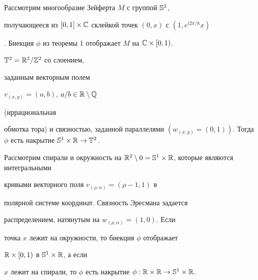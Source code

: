 \begin{exam}


Рассмотрим многообразие Зейферта $M$ с группой $\Bbb{S}^1$,


получающееся из $[0, 1] \times \Bbb{C}$ склейкой точек $(0, x)$ с $(1,


e^{i 2 \pi/k} x)$


\cite{Ar}. Биекция $\phi$ из теоремы 1 отображает $M$ на $\Bbb{C}


\times [0,1)$.


\end{exam}





\begin{exam}


$\Bbb{T}^2=\Bbb{R}^2/\Bbb{Z}^2$ со слоением,


заданным векторным полем


$v_{(x,y)}=(a, b)$, $a/b \in \Bbb{R} \setminus \Bbb{Q}$


(иррациональная


обмотка тора) и связностью, заданной параллелями $(w_{(x,y)}=(0,


1))$. Тогда $\phi$ есть накрытие $\Bbb{S}^1 \times \Bbb{R} \to


\Bbb{T}^2$.


\end{exam}





\begin{exam}


Рассмотрим спирали и окружность на $\Bbb{R}^2 \setminus


{0} = \Bbb{S}^1 \times \Bbb{R}$, которые являются интегральными


кривыми векторного поля $v_{(\rho, \alpha)}= (\rho -1,1)$ в


полярной системе координат. Связность Эресмана задается


распределением, натянутым на $w_{(\rho, \alpha)}=(1,0)$. Если


точка $x$ лежит на окружности, то биекция $\phi$ отображает


$\Bbb{R} \times [0, 1)$ в $\Bbb{S}^1 \times \Bbb{R}$, а если


$x$ лежит на спирали, то $\phi$ есть накрытие $\phi:


\Bbb{R} \times \Bbb{R} \to \Bbb{S}^1 \times \Bbb{R}$.


\end{exam}








